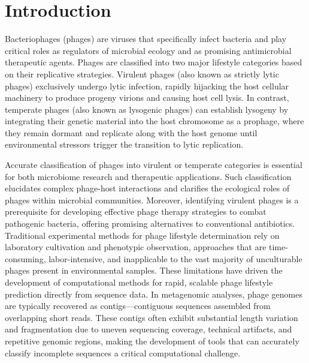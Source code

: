 \documentclass[runningheads]{llncs}
\begin{document}
\section{Introduction}
Bacteriophages (phages) are viruses that specifically infect bacteria and play critical roles as regulators of microbial ecology and as promising antimicrobial therapeutic agents. Phages are classified into two major lifestyle categories based on their replicative strategies\cite{wu2021deephage}. Virulent phages (also known as strictly lytic phages) exclusively undergo lytic infection, rapidly hijacking the host cellular machinery to produce progeny virions and causing host cell lysis\cite{mcnair2012phacts}. In contrast, temperate phages (also known as lysogenic phages) can establish lysogeny by integrating their genetic material into the host chromosome as a prophage, where they remain dormant and replicate along with the host genome until environmental stressors trigger the transition to lytic replication\cite{mcnair2012phacts}.

Accurate classification of phages into virulent or temperate categories is essential for both microbiome research and therapeutic applications\cite{shang2023phatyp}. Such classification elucidates complex phage-host interactions and clarifies the ecological roles of phages within microbial communities\cite{shang2023phatyp}. Moreover, identifying virulent phages is a prerequisite for developing effective phage therapy strategies to combat pathogenic bacteria, offering promising alternatives to conventional antibiotics\cite{azimi2019phage}. Traditional experimental methods for phage lifestyle determination rely on laboratory cultivation and phenotypic observation, approaches that are time-consuming, labor-intensive, and inapplicable to the vast majority of unculturable phages present in environmental samples\cite{shang2023phatyp}. These limitations have driven the development of computational methods for rapid, scalable phage lifestyle prediction directly from sequence data. In metagenomic analyses, phage genomes are typically recovered as contigs—contiguous sequences assembled from overlapping short reads\cite{setubal2021metagenome,ghurye2016metagenomic}. These contigs often exhibit substantial length variation and fragmentation due to uneven sequencing coverage, technical artifacts, and repetitive genomic regions, making the development of tools that can accurately classify incomplete sequences a critical computational challenge.
\end{document}
